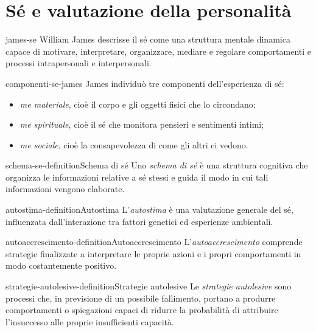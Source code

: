 \documentclass[preview]{standalone}
\begin{document}
\genpage

\section{Sé e valutazione della personalità}

\begin{snippet}{james-se}
    William James descrisse il sé come una struttura mentale dinamica capace di
    motivare, interpretare, organizzare, mediare e regolare comportamenti e
    processi intrapersonali e interpersonali.
\end{snippet}

\begin{snippet}{componenti-se-james}
    James individuò tre componenti dell'esperienza di sé:
    \begin{itemize}
        \item \emph{me materiale}, cioè il corpo e gli oggetti fisici che lo
        circondano;
        \item \emph{me spirituale}, cioè il sé che monitora pensieri e
        sentimenti intimi;
        \item \emph{me sociale}, cioè la consapevolezza di come gli altri ci
        vedono.
    \end{itemize}
\end{snippet}

\begin{snippetdefinition}{schema-se-definition}{Schema di sé}
    Uno \emph{schema di sé} è una struttura cognitiva che organizza le
    informazioni relative a sé stessi e guida il modo in cui tali informazioni
    vengono elaborate.
\end{snippetdefinition}

\begin{snippetdefinition}{autostima-definition}{Autostima}
    L'\emph{autostima} è una valutazione generale del sé, influenzata
    dall'interazione tra fattori genetici ed esperienze ambientali.
\end{snippetdefinition}

\begin{snippetdefinition}{autoaccrescimento-definition}{Autoaccrescimento}
    L'\emph{autoaccrescimento} comprende strategie finalizzate a interpretare le
    proprie azioni e i propri comportamenti in modo costantemente positivo.
\end{snippetdefinition}

\begin{snippetdefinition}{strategie-autolesive-definition}{Strategie autolesive}
    Le \emph{strategie autolesive} sono processi che, in previsione di un
    possibile fallimento, portano a produrre comportamenti o spiegazioni capaci
    di ridurre la probabilità di attribuire l'insuccesso alle proprie
    insufficienti capacità.
\end{snippetdefinition}
\end{document}
